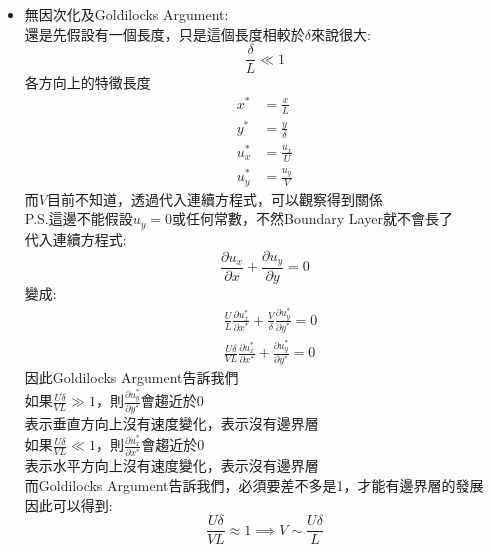 \documentclass[../main.tex]{subfiles}
\begin{document}
\begin{itemize}
\begin{itemize}
\begin{enumerate}
      \item Isothermal
      \item No Slip
      \item Potential Flow在邊界層外(不受重力影響)
    \end{enumerate}
    \item 無因次化及Goldilocks Argument:\\
    還是先假設有一個長度，只是這個長度相較於$\delta$來說很大:
    \begin{equation}
      \frac{\delta}{L} \ll 1
    \end{equation}
    各方向上的特徵長度
    \begin{align}
      x^\ast &= \frac{x}{L}\\
      y^\ast &= \frac{y}{\delta}\\
      u_x^\ast &= \frac{u_x}{U} \\
      u_y^\ast &= \frac{u_y}{\boxed{V}}
    \end{align}
    而$V$目前不知道，透過代入連續方程式，可以觀察得到關係\\
    P.S.這邊不能假設$u_y=0$或任何常數，不然Boundary Layer就不會長了\\
    代入連續方程式:
    \begin{equation}
      \frac{\partial u_x}{\partial x} + \frac{\partial u_y}{\partial y} = 0
    \end{equation}
    變成:
    \begin{align}
      &\frac{U}{L} \frac{\partial u_x^\ast}{\partial x^\ast} + \frac{V}{\delta} \frac{\partial u_y^\ast}{\partial y^\ast} = 0
      \nonumber\\
      &\boxed{\frac{U\delta}{VL}} \frac{\partial u_x^\ast}{\partial x^\ast} + \frac{\partial u_y^\ast}{\partial y^\ast} = 0
    \end{align}
    因此Goldilocks Argument告訴我們\\
    如果$\frac{U\delta}{VL} \gg 1$，則$\frac{\partial u_y^\ast}{\partial y^\ast}$會趨近於0\\
    表示垂直方向上沒有速度變化，表示沒有邊界層\\
    如果$\frac{U\delta}{VL} \ll 1$，則$\frac{\partial u_x^\ast}{\partial x^\ast}$會趨近於0\\
    表示水平方向上沒有速度變化，表示沒有邊界層\\
    而Goldilocks Argument告訴我們，必須要差不多是1，才能有邊界層的發展\\
    因此可以得到:
    \begin{equation}
      \frac{U\delta}{VL} \approx 1 \implies V \sim \frac{U\delta}{L}

\end{equation}
\end{itemize}
\end{itemize}
\end{document}

